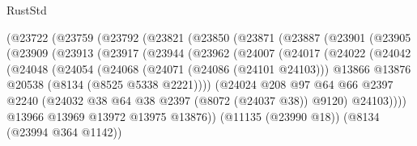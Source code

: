 \begin{lexlean}{RustStd}
\begin{coremodule}
                (@23722
                  (@23759
                    (@23792
                      (@23821
                        (@23850
                          (@23871
                            (@23887
                              (@23901
                                (@23905
                                  (@23909
                                    (@23913
                                      (@23917
                                        (@23944
                                          (@23962
                                            (@24007
                                              (@24017
                                                (@24022
                                                  (@24042
                                                    (@24048
                                                      (@24054
                                                        (@24068
                                                          (@24071 (@24086 (@24101 @24103)))
                                                          @13866
                                                          @13876
                                                          @20538
                                                          (@8134 (@8525 @5338 @2221))))
                                                      (@24024
                                                        @208
                                                        @97
                                                        @64
                                                        @66
                                                        @2397
                                                        @2240
                                                        (@24032
                                                          @38
                                                          @64
                                                          @38
                                                          @2397
                                                          (@8072 (@24037 @38))
                                                          @9120)
                                                        @24103))))
                                                @13966
                                                @13969
                                                @13972
                                                @13975
                                                @13876))
                                            (@11135 (@23990 @18))
                                            (@8134 (@23994 @364 @1142))

\end{coremodule}
\end{lexlean}
